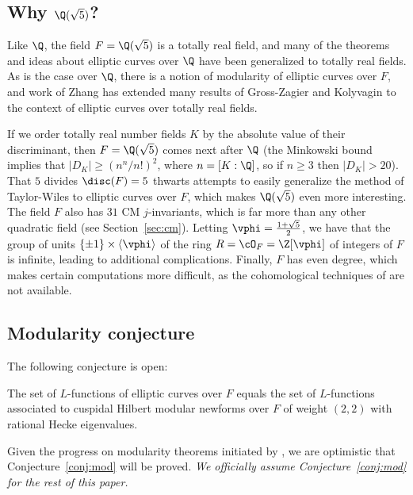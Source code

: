 \documentclass{amsart}
\begin{document}
 
\subsection{Why $\Q(\sqrt{5})$?}

Like $\Q$, the field $F=\Q(\sqrt{5})$ is a totally real field, and
many of the theorems and ideas about elliptic curves over $\Q$ have
been generalized to totally real fields. As is the case over $\Q$,
there is a notion of modularity of elliptic curves over $F$, and work
of Zhang \cite{zhang:heightsshimura} has extended many results of
Gross-Zagier \cite{gross-zagier} and Kolyvagin
\cite{kolyvagin:mordellweil} to the context of elliptic curves over
totally real fields.

If we order totally real number fields $K$ by the absolute value of
their discriminant, then $F=\Q(\sqrt{5})$ comes next after $\Q$ (the
Minkowski bound implies that $|D_K| \geq (n^n/n!)^2$, where
$n=[K:\Q]$, so if $n\geq 3$ then $|D_K|>20$). That $5$ divides
$\disc(F)=5$ thwarts attempts to easily generalize the
method of Taylor-Wiles to elliptic curves over $F$, which makes
$\Q(\sqrt{5})$ even more interesting.
The field $F$ also has $31$ CM $j$-invariants, which is far more than
 any other quadratic field (see Section~\ref{sec:cm}).  Letting
 $\vphi=\frac{1+\sqrt{5}}{2}$, we have that the group of units
 $\{\pm 1\} \times \langle \vphi \rangle$ of the
ring $R=\cO_F=\Z[\vphi]$ of integers of $F$ is infinite, leading to
additional complications.  Finally, $F$ has even degree, which
makes certain computations more difficult, as the cohomological
techniques of \cite{greenberg-voight:shimura} are not available. 


\subsection{Modularity conjecture}\label{sec:mod}
The following conjecture is open:
\begin{conjecture}[Modularity]\label{conj:mod}
  The set of $L$-functions of elliptic curves over $F$ equals the set
  of $L$-functions associated to cuspidal Hilbert modular newforms
  over $F$ of weight $(2,2)$ with rational Hecke eigenvalues.
\end{conjecture}
Given the progress on modularity theorems initiated by
\cite{wiles:fermat}, we are optimistic that Conjecture~\ref{conj:mod}
will be proved.  {\em We officially assume
  Conjecture~\ref{conj:mod} for the rest of this paper.} \\
\end{document}
